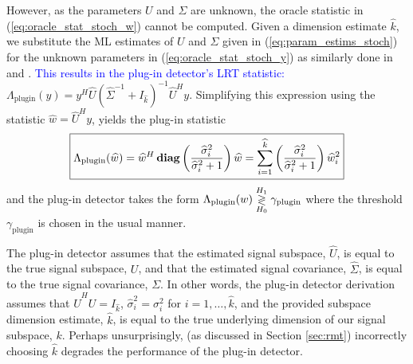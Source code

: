 However, as the parameters $U$ and $\Sigma$ are unknown, the oracle statistic in (\ref{eq:oracle_stat_stoch_w}) cannot be computed. Given a dimension estimate $\widehat{k}$, we substitute the ML estimates of $U$ and $\Sigma$ given in (\ref{eq:param_estims_stoch}) for the unknown parameters in (\ref{eq:oracle_stat_stoch_y}) as similarly done in \cite{jin2005cfar} and \cite{mcwhorter2003matched}. \textcolor{blue}{This results in the plug-in detector's LRT statistic:} $
\Lambda_{\text{plugin}}(y)= y^H\widehat{U}\left(\widehat{\Sigma}^{-1}+I_{\widehat{k}}\right)^{-1}\widehat{U}^Hy$. Simplifying this expression using the statistic $\widehat{w} = \widehat{U}^Hy$, yields the plug-in statistic
\begin{equation}\label{eq:plugin_stat_stoch}
\boxed{\Lambda_{\text{plugin}}(\widehat{w}) = \widehat{w}^H\diag\left(\frac{\widehat{\sigma}^2_i}{\widehat{\sigma}^2_i+1}\right)\widehat{w}=\sum_{i=1}^{\widehat{k}}\left(\frac{\widehat{\sigma}_i^2}{\widehat{\sigma}_i^2+1}\right)\widehat{w}_i^2}
\end{equation}
and the plug-in detector takes the form $\Lambda_{\text{plugin}}(w) \overset{H_1}{\underset{H_0}{\gtrless}} \gamma_{\text{plugin}}$
where the threshold $\gamma_{\text{plugin}}$ is chosen in the usual manner.

The plug-in detector assumes that the estimated signal subspace, $\widehat{U}$, is equal to the true signal subspace, $U$, and that the estimated signal covariance, $\widehat{\Sigma}$, is equal to the true signal covariance, $\Sigma$. In other words,  the plug-in detector derivation assumes that $\widehat{U}^HU=I_{\widehat{k}}$, $\widehat{\sigma}_i^2=\sigma_i^2$ for $i=1,\dots,\widehat{k}$, and the provided subspace dimension estimate, $\widehat{k}$, is equal to the true underlying dimension of our signal subspace, $k$. Perhaps unsurprisingly, (as discussed in Section \ref{sec:rmt}) incorrectly choosing $\widehat{k}$ degrades the performance of the plug-in detector.

